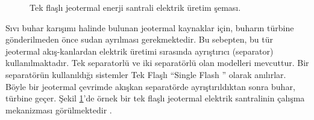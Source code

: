 \begin{figure}[htbp]


\caption{Tek flaşlı jeotermal enerji santrali elektrik üretim şeması.}
\label{fig:singleflash}
\end{figure}

Sıvı buhar karışımı halinde bulunan jeotermal kaynaklar için, buharın türbine gönderilmeden önce sudan ayrılması gerekmektedir. Bu sebepten, bu tür jeotermal akış-kanlardan elektrik üretimi sırasında ayrıştırıcı (separator) kullanılmaktadır. Tek separatorlü ve iki separatörlü olan modelleri mevcuttur. Bir separatörün kullanıldığı sistemler Tek Flaşlı “Single Flash ” olarak anılırlar. Böyle bir jeotermal çevrimde akışkan separatörde ayrıştırıldıktan sonra buhar, türbine geçer. Şekil \ref{fig:singleflash}'de örnek bir tek flaşlı jeotermal elektrik santralinin çalışma mekanizması görülmektedir \cite{dipippo2012geothermal}.

